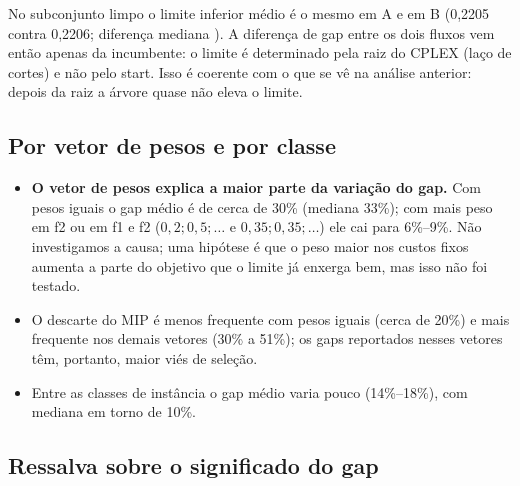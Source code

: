 \documentclass[11pt,a4paper]{article}
\begin{document}
No subconjunto limpo o limite inferior médio é o mesmo em A e em B (0,2205 contra
0,2206; diferença mediana \boundDiffMedian{}). A diferença de gap entre os dois
fluxos vem então apenas da incumbente: o limite é determinado pela raiz do CPLEX
(laço de cortes) e não pelo start. Isso é coerente com o que se vê na análise
anterior: depois da raiz a árvore quase não eleva o limite.

\subsection{Por vetor de pesos e por classe}

\begin{table}[H]
  \centering
  \scriptsize
  \resizebox{\textwidth}{!}{}
  \caption{Gap por vetor de pesos. ``A (rep.)'' e ``B (rep.)'' são os gaps reportados
  (só tarefas com MIP aceito); ``B (MIP)'' usa o estágio \texttt{exact\_start} das 900
  tarefas; ``sem MIP'' é a fração de tarefas em que a solução do MIP foi descartada.}
  \label{tab:gap-peso}
\end{table}

\begin{table}[H]
  \centering
  \scriptsize
  \resizebox{\textwidth}{!}{}
  \caption{Gap por classe de instância.}
  \label{tab:gap-classe}
\end{table}

\begin{itemize}[leftmargin=*]
  \item \textbf{O vetor de pesos explica a maior parte da variação do gap.} Com pesos
  iguais o gap médio é de cerca de 30\% (mediana 33\%); com mais peso em f2 ou em f1
  e f2 ($0{,}2;0{,}5;\ldots$ e $0{,}35;0{,}35;\ldots$) ele cai para 6\%--9\%. Não
  investigamos a causa; uma hipótese é que o peso maior nos custos fixos aumenta a parte do
  objetivo que o limite já enxerga bem, mas isso não foi testado.
  \item O descarte do MIP é menos frequente com pesos iguais (cerca de 20\%) e mais
  frequente nos demais vetores (30\% a 51\%); os gaps reportados nesses vetores
  têm, portanto, maior viés de seleção.
  \item Entre as classes de instância o gap médio varia pouco (14\%--18\%), com
  mediana em torno de 10\%.
\end{itemize}

\subsection{Ressalva sobre o significado do gap}
\end{document}
